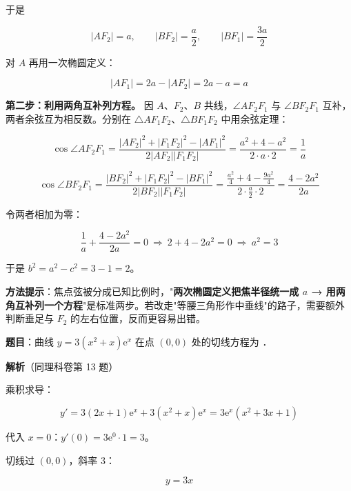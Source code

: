 于是

\[\left|AF_2\right|=a,\qquad \left|BF_2\right|=\frac a2,\qquad \left|BF_1\right|=\frac{3a}2\]

对 $A$ 再用一次椭圆定义：

\[\left|AF_1\right|=2a-\left|AF_2\right|=2a-a=a\]

\textbf{第二步：利用两角互补列方程。} 因 $A$、$F_2$、$B$ 共线，$\angle AF_2F_1$ 与 $\angle BF_2F_1$ 互补，两者余弦互为相反数。分别在 $\triangle AF_1F_2$、$\triangle BF_1F_2$ 中用余弦定理：

\[\cos\angle AF_2F_1=\frac{\left|AF_2\right|^{2}+\left|F_1F_2\right|^{2}-\left|AF_1\right|^{2}}{2\left|AF_2\right|\left|F_1F_2\right|}=\frac{a^{2}+4-a^{2}}{2\cdot a\cdot2}=\frac1a\]

\[\cos\angle BF_2F_1=\frac{\left|BF_2\right|^{2}+\left|F_1F_2\right|^{2}-\left|BF_1\right|^{2}}{2\left|BF_2\right|\left|F_1F_2\right|}=\frac{\frac{a^{2}}4+4-\frac{9a^{2}}4}{2\cdot\frac a2\cdot2}=\frac{4-2a^{2}}{2a}\]

令两者相加为零：

\[\frac1a+\frac{4-2a^{2}}{2a}=0\ \Longrightarrow\ 2+4-2a^{2}=0\ \Longrightarrow\ a^{2}=3\]

于是 $b^{2}=a^{2}-c^{2}=3-1=2$。


\begin{gktip}
\textbf{方法提示}：焦点弦被分成已知比例时，"\textbf{两次椭圆定义把焦半径统一成 $a$ → 用两角互补列一个方程}"是标准两步。若改走"等腰三角形作中垂线"的路子，需要额外判断垂足与 $F_2$ 的左右位置，反而更容易出错。
\end{gktip}

\par\medskip



\textbf{题目}：曲线 $y=3\left(x^{2}+x\right)\mathrm e^{x}$ 在点 $(0,0)$ 处的切线方程为 \gkblank{}．

\textbf{解析}（同理科卷第 13 题）

乘积求导：

\[y'=3(2x+1)\mathrm e^{x}+3\left(x^{2}+x\right)\mathrm e^{x}=3\mathrm e^{x}\left(x^{2}+3x+1\right)\]

代入 $x=0$：$y'(0)=3\mathrm e^{0}\cdot1=3$。

切线过 $(0,0)$，斜率 $3$：

\[y=3x\]

